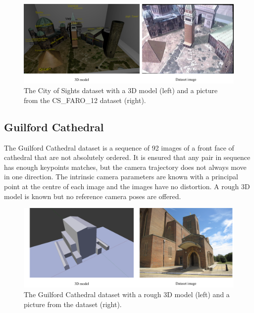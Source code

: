 \begin{figure}[ht]
	\begin{center}
		\includegraphics[keepaspectratio,width=\textwidth]{fig/experiments-city-of-sights.pdf}
	\end{center}
	\caption{The City of Sights dataset with a 3D model (left) and a picture from the CS\_FARO\_12 dataset (right).}
	\label{fig:cityofsights}
\end{figure}

\subsection*{Guilford Cathedral}
The Guilford Cathedral dataset is a sequence of 92 images of a front face of cathedral that are not absolutely ordered. It is ensured that any pair in sequence has enough keypoints matches, but the camera trajectory does not always move in one direction. The intrinsic camera parameters are known with a principal point at the centre of each image and the images have no distortion. A rough 3D model is known but no reference camera poses are offered.

\begin{figure}[ht]
	\begin{center}
		\includegraphics[keepaspectratio,width=\textwidth]{fig/experiments-cathedral.pdf}
	\end{center}
	\caption{The Guilford Cathedral dataset with a rough 3D model (left) and a picture from the dataset (right).}
	\label{fig:cathedral}
\end{figure}

